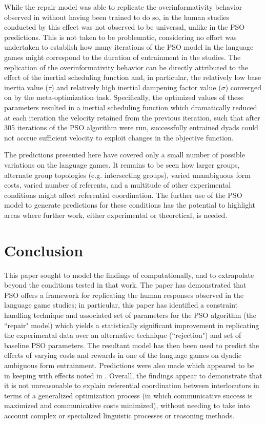 \documentclass[11pt]{article}
\begin{document}
While the repair model was able to replicate the overinformativity behavior observed in \citeauthor{brennan1996} without having been trained to do so, in the human studies conducted by \citeauthor{brennan1996} this effect was not observed to be universal, unlike in the PSO predictions. This is not taken to be problematic, considering no effort was undertaken to establish how many iterations of the PSO model in the \citeauthor{rohde2012} language games might correspond to the duration of entrainment in the \citeauthor{brennan1996} studies. The replication of the overinformativity behavior can be directly attributed to the effect of the inertial scheduling function and, in particular, the relatively low base inertia value ($\tau$) and relatively high inertial dampening factor value ($\sigma$) converged on by the meta-optimization task.  Specifically, the optimized values of these parameters resulted in a inertial scheduling function which dramatically reduced at each iteration the velocity retained from the previous iteration, such that after 305 iterations of the PSO algorithm were run, successfully entrained dyads could not accrue sufficient velocity to exploit changes in the objective function.

The predictions presented here have covered only a small number of possible variations on the \citeauthor{rohde2012} language games. It remains to be seen how larger groups, alternate group topologies (e.g. intersecting groups), varied unambiguous form costs, varied number of referents, and a multitude of other experimental conditions might affect referential coordination. The further use of the PSO model to generate predictions for these conditions has the potential to highlight areas where further work, either experimental or theoretical, is needed.



\section{Conclusion}
This paper sought to model the findings of \citeauthor{rohde2012} computationally, and to extrapolate beyond the conditions tested in that work. The paper has demonstrated that PSO offers a framework for replicating the human responses observed in the \citeauthor{rohde2012} language game studies; in particular, this paper has identified a constraint handling technique and associated set of parameters for the PSO algorithm (the ``repair" model) which yields a statistically significant improvement in replicating the experimental data over an alternative technique (``rejection") and set of baseline PSO parameters. The resultant model has then been used to predict the effects of varying costs and rewards in one of the \citeauthor{rohde2012} language games on dyadic ambiguous form entrainment. Predictions were also made which appeared to be in keeping with effects noted in \citeauthor{brennan1996}. Overall, the findings appear to demonstrate that it is not unreasonable to explain referential coordination between interlocutors in terms of a generalized optimization process (in which communicative success is maximized and communicative costs minimized), without needing to take into account complex or specialized linguistic processes or reasoning methods.
\end{document}
